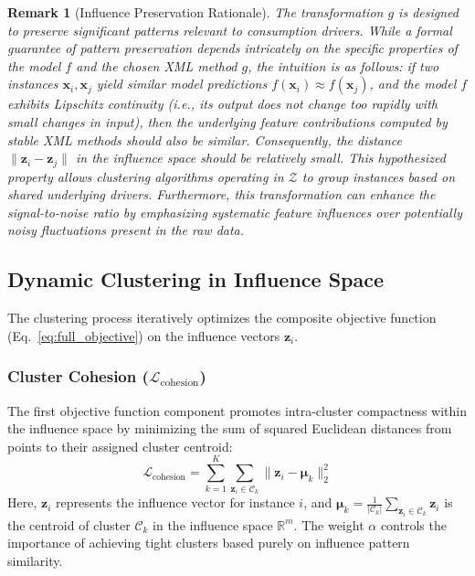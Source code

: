 \documentclass[final,authoryear,3p,times,review,sort&compress]{elsarticle}
\newtheorem{remark}[theorem]{Remark}
\newcommand{\vect}[1]{\mathbf{#1}}
\newcommand{\set}[1]{\mathcal{#1}}
\begin{document}
\begin{remark}[Influence Preservation Rationale]
The transformation $g$ is designed to preserve significant patterns relevant to consumption drivers. While a formal guarantee of pattern preservation depends intricately on the specific properties of the model $f$ and the chosen XML method $g$, the intuition is as follows: if two instances $\vect{x}_i, \vect{x}_j$ yield similar model predictions $f(\vect{x}_i) \approx f(\vect{x}_j)$, and the model $f$ exhibits Lipschitz continuity (i.e., its output does not change too rapidly with small changes in input), then the underlying feature contributions computed by stable XML methods should also be similar. Consequently, the distance $\|\vect{z}_i - \vect{z}_j\|$ in the influence space should be relatively small. This hypothesized property allows clustering algorithms operating in $\set{Z}$ to group instances based on shared underlying drivers. Furthermore, this transformation can enhance the signal-to-noise ratio by emphasizing systematic feature influences over potentially noisy fluctuations present in the raw data.
\end{remark}

\subsection{Dynamic Clustering in Influence Space}
\label{sec:dynamic_clustering_algo_method}
The clustering process iteratively optimizes the composite objective function (Eq.~\ref{eq:full_objective}) on the influence vectors $\vect{z}_i$.

\subsubsection{Cluster Cohesion ($\mathcal{L}_{\text{cohesion}}$)}
The first objective function component promotes intra-cluster compactness within the influence space by minimizing the sum of squared Euclidean distances from points to their assigned cluster centroid:
\begin{equation}
    \mathcal{L}_{\text{cohesion}} = \sum_{k=1}^K \sum_{\vect{z}_i \in \set{C}_k} \|\vect{z}_i - \boldsymbol{\mu}_k\|_2^2
\end{equation}
Here, $\vect{z}_i$ represents the influence vector for instance $i$, and $\boldsymbol{\mu}_k = \frac{1}{|\set{C}_k|} \sum_{\vect{z}_i \in \set{C}_k} \vect{z}_i$ is the centroid of cluster $\set{C}_k$ in the influence space $\mathbb{R}^m$. The weight $\alpha$ controls the importance of achieving tight clusters based purely on influence pattern similarity.
\end{document}
